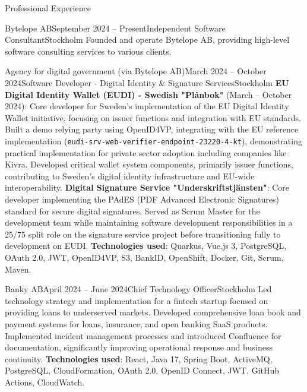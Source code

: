 \documentclass{resume}
\begin{document}
\begin{rSection}{Professional Experience}

\begin{rSubsection}{Bytelope AB}{September 2024 -- Present}{Independent Software Consultant}{Stockholm}
\bItem Founded and operate Bytelope AB, providing high-level software consulting services to various clients.
\end{rSubsection}

\begin{rSubsection}{Agency for digital government (via Bytelope AB)}{March 2024 -- October 2024}{Software Developer - Digital Identity \& Signature Services}{Stockholm} %
\bItem \textbf{EU Digital Identity Wallet (EUDI) - Swedish "Plånbok"} (March -- October 2024): Core developer for Sweden's implementation of the EU Digital Identity Wallet initiative, focusing on issuer functions and integration with EU standards.
\bItem Built a demo relying party using OpenID4VP, integrating with the EU reference implementation (\texttt{eudi-srv-web-verifier-endpoint-23220-4-kt}), demonstrating practical implementation for private sector adoption including companies like Kivra.
\bItem Developed critical wallet system components, primarily issuer functions, contributing to Sweden's digital identity infrastructure and EU-wide interoperability.
\bItem \textbf{Digital Signature Service "Underskriftstjänsten"}: Core developer implementing the PAdES (PDF Advanced Electronic Signatures) standard for secure digital signatures.
\bItem Served as Scrum Master for the development team while maintaining software development responsibilities in a 25/75 split role on the signature service project before transitioning fully to development on EUDI.
\bItem \textbf{Technologies used}: Quarkus, Vue.js 3, PostgreSQL, OAuth 2.0, JWT, OpenID4VP, S3, BankID, OpenShift, Docker, Git, Scrum, Maven.
\end{rSubsection}

\begin{rSubsection}{Banky AB}{April 2024 -- June 2024}{Chief Technology Officer}{Stockholm}
\bItem Led technology strategy and implementation for a fintech startup focused on providing loans to underserved markets.
\bItem Developed comprehensive loan book and payment systems for loans, insurance, and open banking SaaS products.
\bItem Implemented incident management processes and introduced Confluence for documentation, significantly improving operational response and business continuity.
\bItem \textbf{Technologies used}: React, Java 17, Spring Boot, ActiveMQ, PostgreSQL, CloudFormation, OAuth 2.0, OpenID Connect, JWT, GitHub Actions, CloudWatch.
\end{rSubsection}


\end{rSection}
\end{document}
